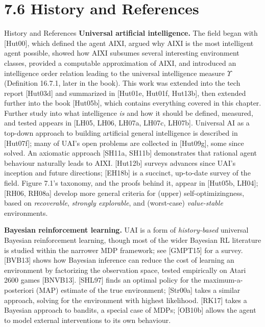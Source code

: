 \documentclass[aspectratio=169,10pt]{beamer}
\begin{document}
\section{7.6 History and References}

\begin{frame}[allowframebreaks]{History and References}
  \textbf{Universal artificial intelligence.} The field began with
  [Hut00], which defined the agent AIXI, argued why AIXI is the most
  intelligent agent possible, showed how AIXI subsumes several interesting
  environment classes, provided a computable approximation of AIXI, and
  introduced an intelligence order relation leading to the universal
  intelligence measure $\Upsilon$ (Definition 16.7.1, later in the book).
  This work was extended into the tech report [Hut03d] and summarized in
  [Hut01e, Hut01f, Hut13b], then extended further into the book [Hut05b],
  which contains everything covered in this chapter. Further study into
  what intelligence \emph{is} and how it should be defined, measured, and
  tested appears in [LH05, LH06, LH07a, LH07c, LH07b]. Universal AI as a
  top-down approach to building artificial general intelligence is
  described in [Hut07f]; many of UAI's open problems are collected in
  [Hut09g], some since solved. An axiomatic approach [SH11a, SH11b]
  demonstrates that rational agent behaviour naturally leads to AIXI.
  [Hut12b] surveys advances since UAI's inception and future directions;
  [EH18b] is a succinct, up-to-date survey of the field. Figure 7.1's
  taxonomy, and the proofs behind it, appear in [Hut05b, LH04]; [RH06,
  RH08a] develop more general criteria for (upper) self-optimizingness,
  based on \emph{recoverable}, \emph{strongly explorable}, and
  (worst-case) \emph{value-stable} environments.

  \framebreak
  \textbf{Bayesian reinforcement learning.} UAI is a form of
  \emph{history-based} universal Bayesian reinforcement learning, though
  most of the wider Bayesian RL literature is studied within the narrower
  MDP framework; see [GMPT15] for a survey. [BVB13] shows how Bayesian
  inference can reduce the cost of learning an environment by factorizing
  the observation space, tested empirically on Atari 2600 games [BNVB13].
  [SHL97] finds an optimal policy for the maximum-a-posteriori (MAP)
  estimate of the true environment; [Str00a] takes a similar approach,
  solving for the environment with highest likelihood. [RK17] takes a
  Bayesian approach to bandits, a special case of MDPs; [OB10b] allows the
  agent to model external interventions to its own behaviour.


\end{frame}
\end{document}
